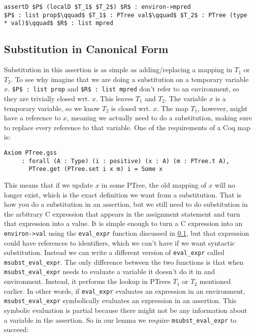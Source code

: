 \documentclass{puthesis}
\begin{document}
\begin{lstlisting}
assertD $P$ (localD $T_1$ $T_2$) $R$ : environ->mpred
$P$ : list prop$\qquad$ $T_1$ : PTree val$\qquad$ $T_2$ : PTree (type * val)$\qquad$ $R$ : list mpred
\end{lstlisting}

\subsection{Substitution in Canonical Form}

Substitution in this assertion is 
as simple as adding/replacing a mapping in $T_1$ or $T_2$. To see why imagine
that we are doing a substitution on a temporary variable $x$. 
\lstinline|$P$ : list prop| and \lstinline|$R$ : list mpred| don't
refer to an environment, so they are trivially closed wrt.
$x$. This leaves $T_1$ and $T_2$. The variable $x$
is a temporary variable, so we know $T_2$ is closed wrt. $x$.
The map $T_1$, however, might have a reference to $x$, meaning
we actually need to do a substitution, making sure to replace every reference
to that variable. One of the requirements of a Coq map is:

\begin{lstlisting}
Axiom PTree.gss
     : forall (A : Type) (i : positive) (x : A) (m : PTree.t A),
       PTree.get (PTree.set i x m) i = Some x
\end{lstlisting}

This means that if we update $x$ in some PTree, the old
mapping of $x$ will no longer exist, which is the exact
definition we want from a substitution. That is how you do a substitution
in an assertion, but we still need to do substitution in the arbitrary
C expression that appears in the assignment statement and turn that expression
into a value. It is simple enough to turn a C expression
into an \lstinline|environ->val| using the \lstinline|eval_expr| function
discussed in \ref{}, but that expression could have references to identifiers,
which we can't have if we want syntactic substitution. Instead we can write
a different version of \lstinline|eval_expr| called 
\lstinline|msubst_eval_expr|. The only difference between the two functions
is that when \lstinline|msubst_eval_expr| needs to evaluate a variable it
doesn't do it in and environment. Instead, it performs the lookup in 
PTrees $T_1$ or $T_2$ mentioned earlier. In other words, if
\lstinline|eval_expr| evaluates an expression in an environment, 
\lstinline|msubst_eval_expr| symbolically evaluates an expression
in an assertion. This symbolic evaluation is partial because there might
not be any information about a variable in the assertion. So in our
lemma we require \lstinline|msubst_eval_expr| to succeed:
\end{document}
